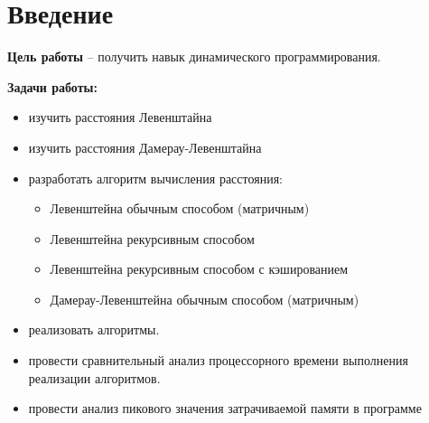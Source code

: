 \chapter*{Введение}
\textbf{Цель работы} – получить навык динамического программирования.

\textbf{Задачи работы:}
\begin{itemize}
	\item изучить расстояния Левенштайна
	\item изучить расстояния Дамерау-Левенштайна
	\item разработать алгоритм вычисления расстояния:
	\begin{itemize}
		\item Левенштейна обычным способом (матричным)
		\item Левенштейна рекурсивным способом
		\item Левенштейна рекурсивным способом с кэшированием
		\item Дамерау-Левенштейна обычным способом (матричным)
	\end{itemize}
	\item реализовать алгоритмы.
	\item провести сравнительный анализ процессорного времени выполнения реализации алгоритмов.
	\item провести анализ пикового значения затрачиваемой памяти в программе
\end{itemize}